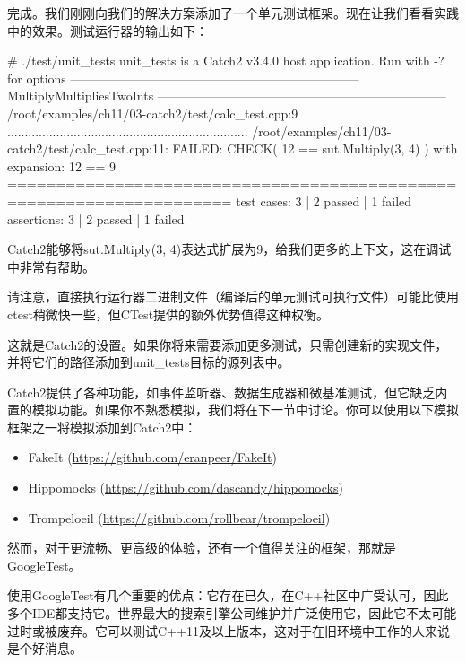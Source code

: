 
完成。我们刚刚向我们的解决方案添加了一个单元测试框架。现在让我们看看实践中的效果。测试运行器的输出如下：

\begin{shell}
# ./test/unit_tests
unit_tests is a Catch2 v3.4.0 host application.
Run with -? for options
---------------------------------------------------------------------
MultiplyMultipliesTwoInts
---------------------------------------------------------------------
/root/examples/ch11/03-catch2/test/calc_test.cpp:9
.....................................................................
/root/examples/ch11/03-catch2/test/calc_test.cpp:11: FAILED:
  CHECK( 12 == sut.Multiply(3, 4) )
with expansion:
  12 == 9
=====================================================================
test cases: 3 | 2 passed | 1 failed
assertions: 3 | 2 passed | 1 failed
\end{shell}

Catch2能够将sut.Multiply(3, 4)表达式扩展为9，给我们更多的上下文，这在调试中非常有帮助。

请注意，直接执行运行器二进制文件（编译后的单元测试可执行文件）可能比使用ctest稍微快一些，但CTest提供的额外优势值得这种权衡。

这就是Catch2的设置。如果你将来需要添加更多测试，只需创建新的实现文件，并将它们的路径添加到unit\_tests目标的源列表中。

Catch2提供了各种功能，如事件监听器、数据生成器和微基准测试，但它缺乏内置的模拟功能。如果你不熟悉模拟，我们将在下一节中讨论。你可以使用以下模拟框架之一将模拟添加到Catch2中：

\begin{itemize}
\item
FakeIt (\url{https://github.com/eranpeer/FakeIt})

\item
Hippomocks (\url{https://github.com/dascandy/hippomocks})

\item
Trompeloeil (\url{https://github.com/rollbear/trompeloeil})
\end{itemize}

然而，对于更流畅、更高级的体验，还有一个值得关注的框架，那就是GoogleTest。


使用GoogleTest有几个重要的优点：它存在已久，在C++社区中广受认可，因此多个IDE都支持它。世界最大的搜索引擎公司维护并广泛使用它，因此它不太可能过时或被废弃。它可以测试C++11及以上版本，这对于在旧环境中工作的人来说是个好消息。

